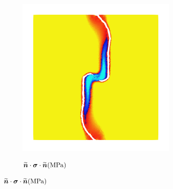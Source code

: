 \begin{figure}[htb!]
  \centering
  \begin{subfigure}[b]{0.35\textwidth}
    \centering
    \includegraphics[width=\textwidth]{Chapter4/figures/biaxial_nosplit_stress.png}
  \end{subfigure}
  \begin{subfigure}[b]{0.15\textwidth}
    \centering
    \caption*{$\widetilde{\boldsymbol{n}} \cdot \boldsymbol{\sigma} \cdot \widetilde{\boldsymbol{n}} (\SI{}{\mega\pascal})$}

\end{subfigure}
\end{figure}
